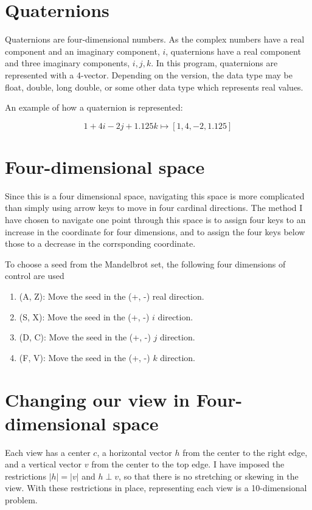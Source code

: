 \documentclass[a4paper]{article}
\begin{document}
\section{Quaternions}

Quaternions are four-dimensional numbers.  As the complex numbers have a real component and an imaginary component, $i$, quaternions have a real component and three imaginary components, $i, j, k$.  In this program, quaternions are represented with a 4-vector.  Depending on the version, the data type may be float, double, long double, or some other data type which represents real values.

An example of how a quaternion is represented:

$$1 + 4i - 2j + 1.125k \mapsto [ 1, 4, -2, 1.125 ]$$

\section{Four-dimensional space}

Since this is a four dimensional space, navigating this space is more complicated than simply using arrow keys to move in four cardinal directions.  The method I have chosen to navigate one point through this space is to assign four keys to an increase in the coordinate for four dimensions, and to assign the four keys below those to a decrease in the corrsponding coordinate.

To choose a seed from the Mandelbrot set, the following four dimensions of control are used

\begin{enumerate}
    \item (A, Z): Move the seed in the (+, -) real direction.
    \item (S, X): Move the seed in the (+, -) $i$ direction.
    \item (D, C): Move the seed in the (+, -) $j$ direction.
    \item (F, V): Move the seed in the (+, -) $k$ direction.
\end{enumerate}

\section{Changing our view in Four-dimensional space}

Each view has a center $c$, a horizontal vector $h$ from the center to the right edge, and a vertical vector $v$ from the center to the top edge.  I have imposed the restrictions $|h| = |v|$ and $h \perp v$, so that there is no stretching or skewing in the view.  With these restrictions in place, representing each view is a 10-dimensional problem.
\end{document}
